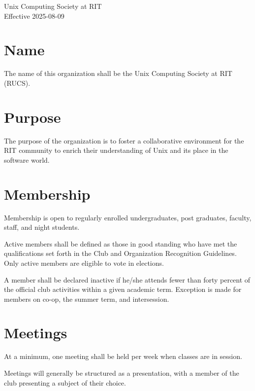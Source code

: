 \documentclass[a4paper]{article}
\newcommand{\pagetitle}[2]{
	\begin{titlepage}
	\vspace*{\fill}
		\begin{center}
			\Huge {#1} \\[0.0625in]
			\LARGE {#2}
		\end{center}
	\vspace*{\fill}
	\end{titlepage}
}
\begin{document}
\pagetitle{Unix Computing Society at RIT}{Effective 2025-08-09}

\section{Name}
The name of this organization shall be the Unix Computing Society at RIT (RUCS).

\section{Purpose}
The purpose of the organization is to foster a collaborative environment for the RIT community to enrich their understanding of Unix and its place in the software world. 

\section{Membership}
\begin{subroutines}
\item Membership is open to regularly enrolled undergraduates, post graduates, faculty, staff, and night students.
\item Active members shall be defined as those in good standing who have met the qualifications set forth in the Club and Organization Recognition Guidelines. Only active members are eligible to vote in elections.
\item A member shall be declared inactive if he/she attends fewer than forty percent of the official club activities within a given academic term. Exception is made for members on co-op, the summer term, and intersession.
\end{subroutines}

\section{Meetings}
\begin{subroutines}
    \item At a minimum, one meeting shall be held per week when classes are in session.
    \item Meetings will generally be structured as a presentation, with a member of the club presenting a subject of their choice.
\end{subroutines}
\end{document}
